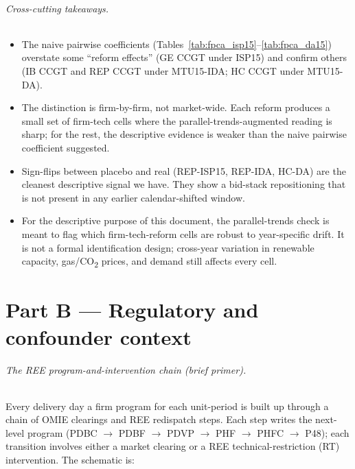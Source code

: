 \documentclass[11pt,a4paper]{article}
\begin{document}
\paragraph{Cross-cutting takeaways.}
\begin{itemize}
\item The naive pairwise coefficients (Tables~\ref{tab:fpca_isp15}--\ref{tab:fpca_da15}) overstate some ``reform effects'' (GE CCGT under ISP15) and confirm others (IB CCGT and REP CCGT under MTU15-IDA; HC CCGT under MTU15-DA).
\item The distinction is firm-by-firm, not market-wide. Each reform produces a small set of firm-tech cells where the parallel-trends-augmented reading is sharp; for the rest, the descriptive evidence is weaker than the naive pairwise coefficient suggested.
\item Sign-flips between placebo and real (REP-ISP15, REP-IDA, HC-DA) are the cleanest descriptive signal we have. They show a bid-stack repositioning that is not present in any earlier calendar-shifted window.
\item For the descriptive purpose of this document, the parallel-trends check is meant to flag which firm-tech-reform cells are robust to year-specific drift. It is not a formal identification design; cross-year variation in renewable capacity, gas/CO\textsubscript{2} prices, and demand still affects every cell.
\end{itemize}



\part{Part B --- Regulatory and confounder context}

\paragraph{The REE program-and-intervention chain (brief primer).} Every delivery day a firm program for each unit-period is built up through a chain of OMIE clearings and REE redispatch steps. Each step writes the next-level program (PDBC $\to$ PDBF $\to$ PDVP $\to$ PHF $\to$ PHFC $\to$ P48); each transition involves either a market clearing or a REE technical-restriction (RT) intervention. The schematic is:
\end{document}
